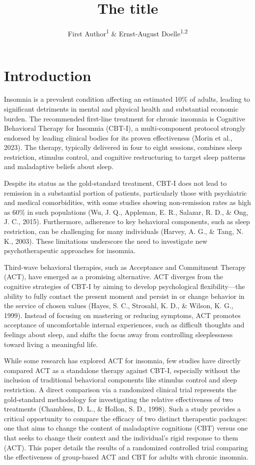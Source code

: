 \documentclass[
  english,
  man]{apa6}
\title{The title}
\author{First Author\textsuperscript{1} \& Ernst-August Doelle\textsuperscript{1,2}}
\date{}
\affiliation{\vspace{0.5cm}\textsuperscript{1} Wilhelm-Wundt-University\\\textsuperscript{2} Konstanz Business School}
\begin{document}
\maketitle

\section{Introduction}\label{introduction}

Insomnia is a prevalent condition affecting an estimated 10\% of adults, leading to significant detriments in mental and physical health and substantial economic burden. The recommended first-line treatment for chronic insomnia is Cognitive Behavioral Therapy for Insomnia (CBT-I), a multi-component protocol strongly endorsed by leading clinical bodies for its proven effectiveness (Morin et al., 2023). The therapy, typically delivered in four to eight sessions, combines sleep restriction, stimulus control, and cognitive restructuring to target sleep patterns and maladaptive beliefs about sleep.

Despite its status as the gold-standard treatment, CBT-I does not lead to remission in a substantial portion of patients, particularly those with psychiatric and medical comorbidities, with some studies showing non-remission rates as high as 60\% in such populations (Wu, J. Q., Appleman, E. R., Salazar, R. D., \& Ong, J. C., 2015). Furthermore, adherence to key behavioral components, such as sleep restriction, can be challenging for many individuals (Harvey, A. G., \& Tang, N. K., 2003). These limitations underscore the need to investigate new psychotherapeutic approaches for insomnia.

Third-wave behavioral therapies, such as Acceptance and Commitment Therapy (ACT), have emerged as a promising alternative. ACT diverges from the cognitive strategies of CBT-I by aiming to develop psychological flexibility---the ability to fully contact the present moment and persist in or change behavior in the service of chosen values (Hayes, S. C., Strosahl, K. D., \& Wilson, K. G., 1999). Instead of focusing on mastering or reducing symptoms, ACT promotes acceptance of uncomfortable internal experiences, such as difficult thoughts and feelings about sleep, and shifts the focus away from controlling sleeplessness toward living a meaningful life.

While some research has explored ACT for insomnia, few studies have directly compared ACT as a standalone therapy against CBT-I, especially without the inclusion of traditional behavioral components like stimulus control and sleep restriction. A direct comparison via a randomized clinical trial represents the gold-standard methodology for investigating the relative effectiveness of two treatments (Chambless, D. L., \& Hollon, S. D., 1998). Such a study provides a critical opportunity to compare the efficacy of two distinct therapeutic packages: one that aims to change the content of maladaptive cognitions (CBT) versus one that seeks to change their context and the individual's rigid response to them (ACT). This paper details the results of a randomized controlled trial comparing the effectiveness of group-based ACT and CBT for adults with chronic insomnia.
\end{document}
